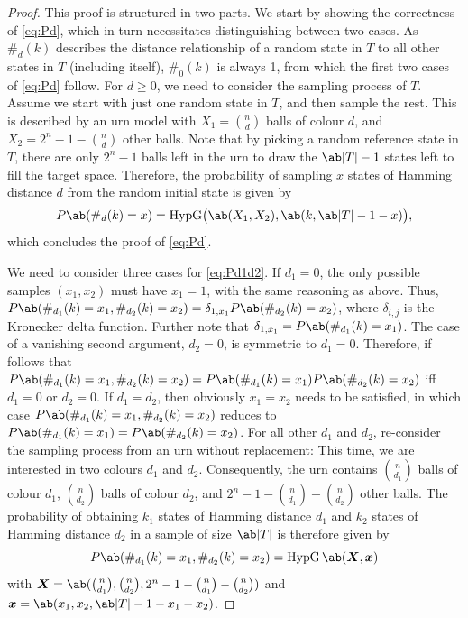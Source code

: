 \begin{proof}
    This proof is structured in two parts. We start by showing the correctness of \cref{eq:Pd}, which in turn necessitates distinguishing between two cases. As $\#_d(k)$ describes the distance relationship of a random state in $T$ to all other states in $T$ (including itself), $\#_0(k)$ is always 1, from which the first two cases of \cref{eq:Pd} follow. For $d \geq 0$, we need to 
    consider the sampling process of $T$. Assume we start with just one random state in $T$, and then sample the rest. This is described by an urn model with $X_1 = \binom{n}{d}$ balls of colour $d$, and $X_2 = 2^n - 1 - \binom{n}{d}$ other balls. Note that by picking a random reference state in $T$, there are only $2^n - 1$ balls left in the urn to draw the $\ab|T| - 1$ states left to fill the target space. Therefore, the probability of sampling $x$ states of Hamming distance $d$ from the random initial state is given by
    \begin{displaymath}
    P\ab(\#_d (k) = x) = \hypgeom\bigl(\ab(X_1, X_2), 
                                    \ab(k, \ab|T| - 1 - x)\bigr),
    \end{displaymath}
%
    which concludes the proof of \cref{eq:Pd}.

    We need to consider three cases for \cref{eq:Pd1d2}. If $d_1 = 0$, the only possible samples $(x_1, x_2)$ must have $x_1 = 1$, with the same reasoning as above. Thus, $P\ab(\#_{d_1} (k) = x_1, \#_{d_2} (k) = x_2) = \delta_{1, x_1} P\ab(\#_{d_2} (k) = x_2)$, where $\delta_{i,j}$ is the Kronecker delta function. Further note that $\delta_{1, x_1} = P\ab(\#_{d_1} (k) = x_1)$. The case of a vanishing second argument, $d_2 = 0$, is symmetric to $d_1 = 0$. Therefore, if follows that $P\ab(\#_{d_1} (k) = x_1, \#_{d_2} (k) = x_2) = P\ab(\#_{d_1} (k) = x_1)P\ab(\#_{d_2} (k) = x_2)$ iff $d_1 = 0$ or $d_2 = 0$. If $d_1 = d_2$,
    then obviously $x_1 = x_2$ needs to be satisfied, in which case $P\ab(\#_{d_1} (k) = x_1, \#_{d_2} (k) = x_2)$ reduces to $P\ab(\#_{d_1} (k) = x_1) = P\ab(\#_{d_2} (k) = x_2)$. For all other $d_1$ and $d_2$, re-consider the sampling process from an urn without replacement: This time, we are interested in two colours $d_1$ and $d_2$. Consequently, the urn contains $\binom{n}{d_1}$ balls of colour $d_1$, $\binom{n}{d_2}$ balls of colour $d_2$, and $2^n - 1 - \binom{n}{d_1} - \binom{n}{d_2}$ other balls. The probability of obtaining $k_1$ states of Hamming distance $d_1$ and $k_2$ states of Hamming distance $d_2$ in a sample of size $\ab|T|$ is therefore given by
    \begin{displaymath}
        P\ab(\#_{d_1} (k) = x_1, \#_{d_2} (k) = x_2) = \hypgeom\ab(\bm{X}, \bm{x})
\end{displaymath}
    with $\bm{X} = \ab(\binom{n}{d_1},\binom{n}{d_2}, 2^n - 1 - \binom{n}{d_1} - \binom{n}{d_2})$ and $\bm{x} = \ab(x_1, x_2, \ab|T| - 1 - x_1 - x_2)$.
\end{proof}

